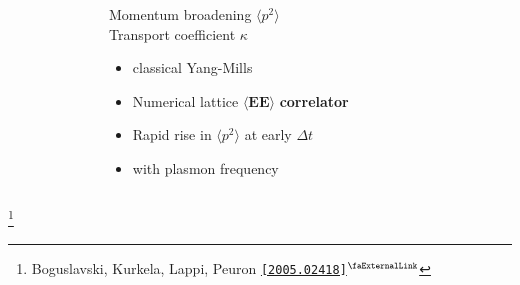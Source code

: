 \documentclass[aspectratio=169,11pt,usenames,dvipsnames]{beamer}
\renewcommand{\thefootnote}{\color{customblue}\faPaperPlaneO}
\newcommand\blfootnote[1]{%
  \begingroup
  \renewcommand\thefootnote{}\footnote{#1}%
  \addtocounter{footnote}{-1}%
  \endgroup
}
\begin{document}
\begin{frame}[t,noframenumbering]
\begin{columns}[onlytextwidth,t]
\begin{figure}
        \end{figure}
        \begin{center}
            {\Large\color{palteal} Momentum broadening $\langle p^2 \rangle$ \\[5pt] Transport coefficient $\kappa$ } \\[10pt]
            \footnotesize
                \begin{itemize}
                \item {\footnotesize\color{lightgray}{\bfseries Over-occupied} classical Yang-Mills}
                \item {\footnotesize\color{lightgray}Numerical lattice $\boldsymbol{\langle EE\rangle}$ {\bfseries correlator}}
                \item {\footnotesize\color{lightgray}Rapid rise in $\langle p^2 \rangle$ at early $\Delta t$}
                \item {\footnotesize{} with plasmon frequency}
            \end{itemize}
        \end{center}
    \end{columns}
    \blfootnote{\scriptsize Boguslavski, Kurkela, Lappi, Peuron \href{https://arxiv.org/abs/2005.02418}{\color{palgold}\texttt{[2005.02418]}$^\text{\scalebox{0.9}{\faExternalLink}}$}}
\end{frame}


\end{document}

